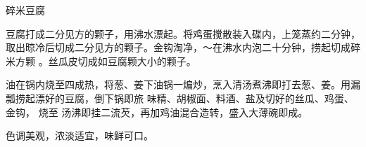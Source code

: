 \begin{recipe}{碎米豆腐}

\ingredients


\cooking

\step 豆腐打成二分见方的颗子，用沸水漂起。将鸡蛋搅散装入碟内，上笼蒸约二分钟，
取出晾冷后切成二分见方的颗子。金钩淘净，〜在沸水内泡二十分钟，捞起切成碎米方颗
。丝瓜皮切成如豆腐颗大小的颗子。

\step 油在锅内烧至四成热，将葱、姜下油锅一煸炒，烹入清汤煮沸即打去葱、姜。用漏
瓢捞起漂好的豆腐，倒下锅即旅 味精、胡椒面、料酒、盐及切好的丝瓜、鸡蛋、金钩，
烧至 汤沸即挂二流芡，再加鸡油混合造转，盛入大薄碗即成。

\features

色调美观，浓淡适宜，味鲜可口。

\end{recipe}

